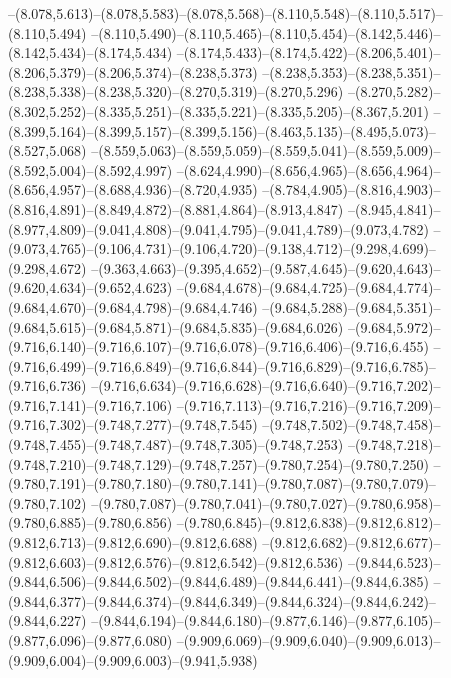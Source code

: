   --(8.078,5.613)--(8.078,5.583)--(8.078,5.568)--(8.110,5.548)--(8.110,5.517)--(8.110,5.494)%
  --(8.110,5.490)--(8.110,5.465)--(8.110,5.454)--(8.142,5.446)--(8.142,5.434)--(8.174,5.434)%
  --(8.174,5.433)--(8.174,5.422)--(8.206,5.401)--(8.206,5.379)--(8.206,5.374)--(8.238,5.373)%
  --(8.238,5.353)--(8.238,5.351)--(8.238,5.338)--(8.238,5.320)--(8.270,5.319)--(8.270,5.296)%
  --(8.270,5.282)--(8.302,5.252)--(8.335,5.251)--(8.335,5.221)--(8.335,5.205)--(8.367,5.201)%
  --(8.399,5.164)--(8.399,5.157)--(8.399,5.156)--(8.463,5.135)--(8.495,5.073)--(8.527,5.068)%
  --(8.559,5.063)--(8.559,5.059)--(8.559,5.041)--(8.559,5.009)--(8.592,5.004)--(8.592,4.997)%
  --(8.624,4.990)--(8.656,4.965)--(8.656,4.964)--(8.656,4.957)--(8.688,4.936)--(8.720,4.935)%
  --(8.784,4.905)--(8.816,4.903)--(8.816,4.891)--(8.849,4.872)--(8.881,4.864)--(8.913,4.847)%
  --(8.945,4.841)--(8.977,4.809)--(9.041,4.808)--(9.041,4.795)--(9.041,4.789)--(9.073,4.782)%
  --(9.073,4.765)--(9.106,4.731)--(9.106,4.720)--(9.138,4.712)--(9.298,4.699)--(9.298,4.672)%
  --(9.363,4.663)--(9.395,4.652)--(9.587,4.645)--(9.620,4.643)--(9.620,4.634)--(9.652,4.623)%
  --(9.684,4.678)--(9.684,4.725)--(9.684,4.774)--(9.684,4.670)--(9.684,4.798)--(9.684,4.746)%
  --(9.684,5.288)--(9.684,5.351)--(9.684,5.615)--(9.684,5.871)--(9.684,5.835)--(9.684,6.026)%
  --(9.684,5.972)--(9.716,6.140)--(9.716,6.107)--(9.716,6.078)--(9.716,6.406)--(9.716,6.455)%
  --(9.716,6.499)--(9.716,6.849)--(9.716,6.844)--(9.716,6.829)--(9.716,6.785)--(9.716,6.736)%
  --(9.716,6.634)--(9.716,6.628)--(9.716,6.640)--(9.716,7.202)--(9.716,7.141)--(9.716,7.106)%
  --(9.716,7.113)--(9.716,7.216)--(9.716,7.209)--(9.716,7.302)--(9.748,7.277)--(9.748,7.545)%
  --(9.748,7.502)--(9.748,7.458)--(9.748,7.455)--(9.748,7.487)--(9.748,7.305)--(9.748,7.253)%
  --(9.748,7.218)--(9.748,7.210)--(9.748,7.129)--(9.748,7.257)--(9.780,7.254)--(9.780,7.250)%
  --(9.780,7.191)--(9.780,7.180)--(9.780,7.141)--(9.780,7.087)--(9.780,7.079)--(9.780,7.102)%
  --(9.780,7.087)--(9.780,7.041)--(9.780,7.027)--(9.780,6.958)--(9.780,6.885)--(9.780,6.856)%
  --(9.780,6.845)--(9.812,6.838)--(9.812,6.812)--(9.812,6.713)--(9.812,6.690)--(9.812,6.688)%
  --(9.812,6.682)--(9.812,6.677)--(9.812,6.603)--(9.812,6.576)--(9.812,6.542)--(9.812,6.536)%
  --(9.844,6.523)--(9.844,6.506)--(9.844,6.502)--(9.844,6.489)--(9.844,6.441)--(9.844,6.385)%
  --(9.844,6.377)--(9.844,6.374)--(9.844,6.349)--(9.844,6.324)--(9.844,6.242)--(9.844,6.227)%
  --(9.844,6.194)--(9.844,6.180)--(9.877,6.146)--(9.877,6.105)--(9.877,6.096)--(9.877,6.080)%
  --(9.909,6.069)--(9.909,6.040)--(9.909,6.013)--(9.909,6.004)--(9.909,6.003)--(9.941,5.938)%
